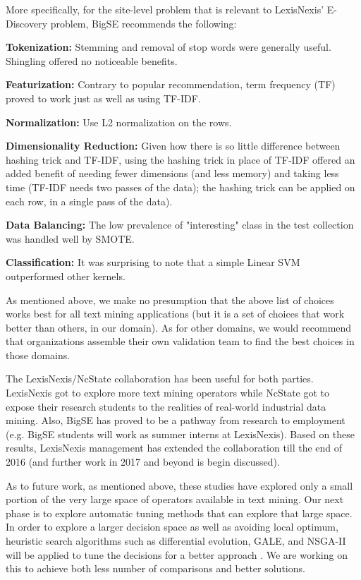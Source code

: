 \documentclass{sig-alternate-05-2015}
\newcommand{\be}{\begin{enumerate*}}
\newcommand{\ee}{\end{enumerate*}}
\theoremstyle{break}
\begin{document}
More specifically, for the site-level problem that is relevant to
LexisNexis' E-Discovery problem, BigSE recommends the following:
\be
\item \textbf{Tokenization:} Stemming and removal of stop words were generally useful. Shingling offered no noticeable benefits. 
\item \textbf{Featurization:} Contrary to popular recommendation, term frequency (TF) proved to work just as well as using TF-IDF.
\item \textbf{Normalization:}  Use L2 normalization on the rows.
\item \textbf{Dimensionality Reduction:} Given how there is so little difference between hashing trick and TF-IDF, using  the hashing trick in place of TF-IDF offered an added benefit of needing fewer dimensions (and less memory) and taking less time (TF-IDF needs  two passes of the data);
the hashing trick can be applied on each row, in a single pass
of the data).
\item \textbf{Data Balancing:} The low prevalence of "interesting" class in the test collection was handled   well by SMOTE.
\item \textbf{Classification:}  It  was surprising to note that a simple Linear SVM outperformed other kernels.
\ee
As mentioned above,    we make no presumption that the above list of choices
  works best for all text mining applications (but it
  is a set of choices that work better than others,
  in our domain).   As for other domains, we would recommend that organizations
assemble their own validation team to find the best choices in those domains.

The LexisNexis/NcState collaboration has been useful
for both parties.
LexisNexis got to explore more  text mining operators while
NcState got to expose their research students to the
realities of real-world industrial data mining.
 Also, BigSE has proved to be a pathway from
research to employment (e.g. BigSE  students  will work as    summer interns at  LexisNexis). 
Based on  these results, LexisNexis management has extended the collaboration till the end of 2016 (and further work in 2017
and beyond is begin discussed).

As to future work, as mentioned  above, these studies have  explored only a small portion of the very large space of operators available in text mining.
Our next phase is to explore automatic tuning methods that can explore that large space.
In order to explore a larger decision space as well as avoiding local optimum, heuristic search algorithms such as differential evolution, GALE, and NSGA-II will be applied to tune the decisions for a better approach \cite{storn1997differential,krall2015gale,deb2002fast}. We are working on this to achieve both less number of comparisons and better solutions.
\end{document}
